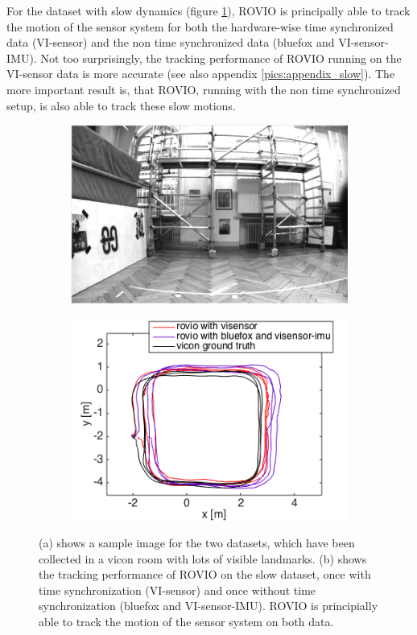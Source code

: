 For the dataset with slow dynamics (figure \ref{pics:timesync_slow}), ROVIO is principally able to track the motion of the sensor system for both the hardware-wise time synchronized data (VI-sensor) and the non time synchronized data (bluefox and VI-sensor-IMU). Not too surprisingly, the tracking performance of ROVIO running on the VI-sensor data is more accurate (see also appendix \ref{pics:appendix_slow}). The more important result is, that ROVIO, running with the non time synchronized setup, is also able to track these slow motions. \\

\begin{figure}
  \begin{subfigure}[b]{0.46\textwidth}
    \includegraphics[width=\textwidth]{images/slow.png}
    \caption{}
  \end{subfigure}
  \hfill
  \begin{subfigure}[b]{0.42\textwidth}
    \includegraphics[width=\textwidth]{images/slow_2D.png}
    \caption{}
  \end{subfigure}
   \caption{(a) shows a sample image for the two datasets, which have been collected in a vicon room with lots of visible landmarks. (b) shows the tracking performance of ROVIO on the slow dataset, once with time synchronization (VI-sensor) and once without time synchronization (bluefox and VI-sensor-IMU). ROVIO is principially able to track the motion of the sensor system on both data.}
   \label{pics:timesync_slow}
\end{figure}

